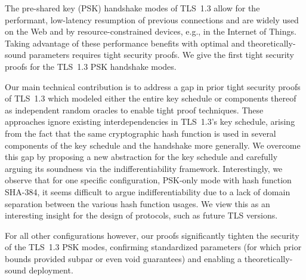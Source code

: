 The pre-shared key (PSK) handshake modes of TLS~1.3 allow for the performant, low-latency resumption of previous connections and are widely used on the Web and by resource-constrained devices, e.g., in the Internet of Things.
Taking advantage of these performance benefits with optimal and theoretically-sound parameters requires tight security proofs.
We give the first tight security proofs for the TLS~1.3 PSK handshake modes.

Our main technical contribution is to address a gap in prior tight security proofs of TLS~1.3 which modeled either the entire key schedule or components thereof as independent random oracles to enable tight proof techniques.
These approaches ignore existing interdependencies in TLS~1.3's key schedule, arising from the fact that the same cryptographic hash function is used in several components of the key schedule and the handshake more generally.
We overcome this gap by proposing a new abstraction for the key schedule and carefully arguing its soundness via the indifferentiability framework.
Interestingly, we observe that for one specific configuration, PSK-only mode with hash function SHA-384, it seems difficult to argue indifferentiability due to a lack of domain separation between the various hash function usages.
We view this as an interesting insight for the design of protocols, such as future TLS versions.

For all other configurations however, our proofs significantly tighten the security of the TLS~1.3 PSK modes, confirming standardized parameters (for which prior bounds provided subpar or even void guarantees) and enabling a theoretically-sound deployment.


%

